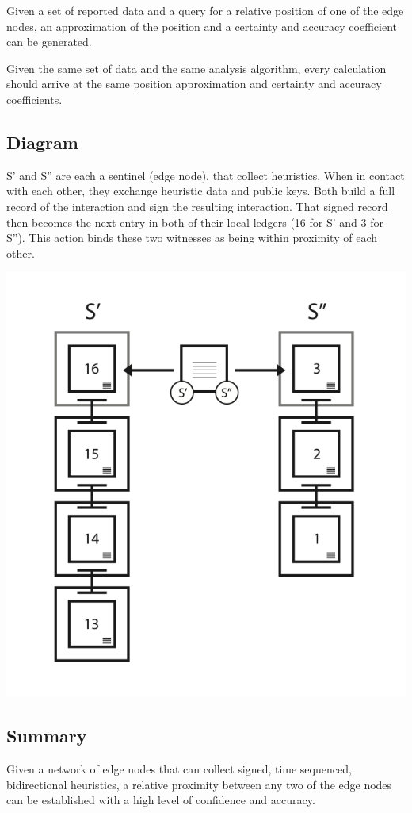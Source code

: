 \documentclass{article}
\begin{document}
Given a set of reported data and a query for a relative position of one of the edge nodes, an approximation of the position and a certainty and accuracy coefficient can be generated.

Given the same set of data and the same analysis algorithm, every calculation should arrive at the same position approximation and certainty and accuracy coefficients.

\subsection {Diagram}
S' and S'' are each a sentinel (edge node), that collect heuristics.  When in contact with each other, they exchange heuristic data and public keys.  Both build a full record of the interaction and sign the resulting interaction.  That signed record then becomes the next entry in both of their local ledgers (16 for S' and 3 for S'').  This action binds these two witnesses as being within proximity of each other.

\includegraphics [width=\textwidth]{boundwitness}

\subsection {Summary}
Given a network of edge nodes that can collect signed, time sequenced, bidirectional heuristics, a relative proximity between any two of the edge nodes can be established with a high level of confidence and accuracy.
\end{document}
